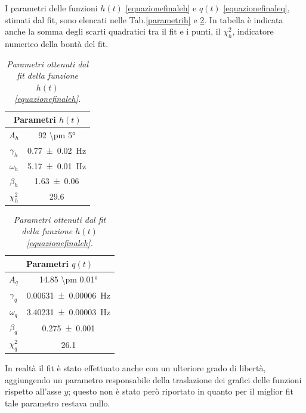 \documentclass[11pt, a4paper, twoside]{article}
\begin{document}
I parametri delle funzioni $h(t)$ \ref{equazionefinaleh} e $q(t)$ \ref{equazionefinaleq}, stimati dal fit, sono elencati nelle Tab.\ref{parametrih} e \ref{parametriq}.
In tabella è indicata anche la somma degli scarti quadratici tra il fit e i punti, il
$\chi^2_h$, indicatore numerico della bontà del fit.
\begin{table}[h!]
  \centering
\begin{minipage}{0.45\linewidth}
  \centering
  \begin{tabular}{cc}
      \toprule
      \multicolumn{2}{c}{Parametri $h(t)$} \\ 
      \midrule
      $A_h$     & \ang{92 \pm 5} \\
      $\gamma_h$& \SI{0.77 \pm 0.02}{\hertz} \\
      $\omega_h$& \SI{5.17 \pm 0.01}{\hertz}\\
      $\beta_h$   &  \SI{1.63 \pm 0.06}{}  \\
      $\chi^2_h$   &  \SI{29.6}{}  \\
      \midrule
    \end{tabular}
  \caption{\textit{Parametri ottenuti dal fit della funzione $h(t)$ \ref{equazionefinaleh}.}}
  \label{parametrih}
\end{minipage}
\begin{minipage}{0.45\linewidth}
  \centering
    \begin{tabular}{cc}
        \toprule
        \multicolumn{2}{c}{Parametri $q(t)$} \\ 
        \midrule
        $A_q$     & \ang{14.85 \pm 0.01} \\
        $\gamma_q$& \SI{0.00631 \pm 0.00006}{\hertz} \\
        $\omega_q$& \SI{3.40231 \pm 0.00003}{\hertz}\\
        $\beta_q$   &  \SI{0.275 \pm 0.001}{}  \\
        $\chi^2_q$   &  \SI{26.1}{}  \\
        \midrule
      \end{tabular}
    \caption{\textit{Parametri ottenuti dal fit della funzione $h(t)$ \ref{equazionefinaleh}.}}
    \label{parametriq}
\end{minipage}
\end{table}
In realtà il fit è stato effettuato anche con un ulteriore grado di libertà, aggiungendo
un parametro responsabile della traslazione dei grafici delle funzioni rispetto 
all'asse $y$; questo non è stato però riportato in quanto per il miglior fit
tale parametro restava nullo.
\end{document}
